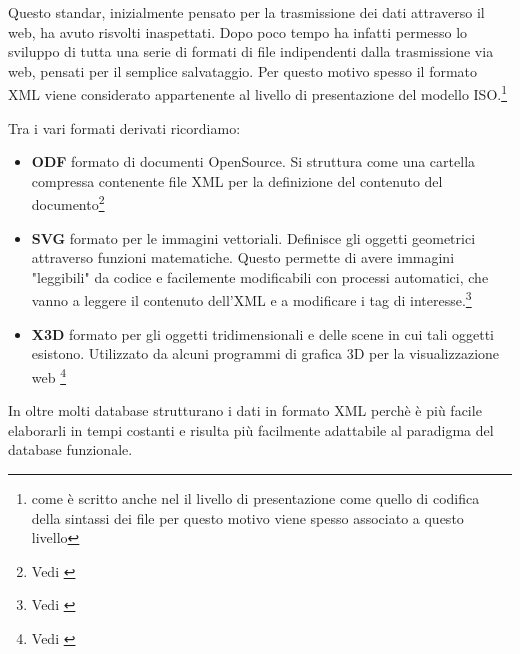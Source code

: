 \documentclass[a4paper,12pt]{report}
\begin{document}
Questo standar, inizialmente pensato per la trasmissione dei dati attraverso il web, ha avuto risvolti inaspettati. Dopo poco tempo ha infatti permesso lo sviluppo di tutta una serie di formati di file indipendenti dalla trasmissione via web, pensati per il semplice salvataggio.
Per questo motivo spesso il formato XML viene considerato appartenente al livello di presentazione del modello ISO.\footnote{come è scritto anche nel\textcite[p.~42]{tanenbaum:reti} il livello di presentazione come quello di codifica della sintassi dei file per questo motivo viene spesso associato a questo livello}

Tra i vari formati derivati ricordiamo:
\begin{itemize}
\item \textbf{ODF} formato di documenti OpenSource. Si struttura come una cartella compressa contenente file XML per la definizione del contenuto del documento\footnote{Vedi \cite{site:isoodf}}
\item \textbf{SVG} formato per le immagini vettoriali. Definisce gli oggetti geometrici attraverso funzioni matematiche. Questo permette di avere immagini "leggibili" da codice e facilemente modificabili con processi automatici, che vanno a leggere il contenuto dell'XML e a modificare i tag di interesse.\footnote{Vedi \cite{site:w3csvg}}
\item \textbf{X3D} formato per gli oggetti tridimensionali e delle scene in cui tali oggetti esistono. Utilizzato da alcuni programmi di grafica 3D per la visualizzazione web \footnote{Vedi \cite{site:w3dx3}}
\end{itemize}
In oltre molti database strutturano i dati in formato XML perchè è più facile elaborarli in tempi costanti e risulta più facilmente adattabile al paradigma del database funzionale.
\end{document}

